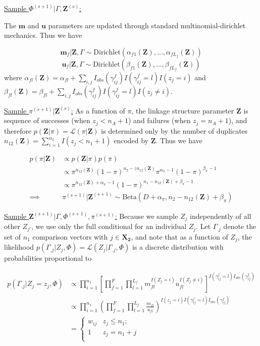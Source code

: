\documentclass[12pt,letterpaper]{article}
\newcommand{\1}[1]{\mathbb{I}\!\left[#1\right]} %
\begin{document}
\underline{Sample $\Phi^{(s+1)}|\Gamma, \bm{Z}^{(s)}$:}

The $\bm{m}$ and $\bm{u}$ parameters are updated through standard multinomial-dirichlet mechanics. Thus we have

$$\bm{m}_f|\bm{Z}, \Gamma \sim \text{Dirichlet}(\alpha_{f1}(\bm{Z}), \ldots, \alpha_{fL_f}(\bm{Z}))$$
$$\bm{u}_f|\bm{Z}, \Gamma \sim \text{Dirichlet}(\beta_{f1}(\bm{Z}), \ldots, \beta_{fL_f}(\bm{Z}))$$
where
\(\alpha_{fl}(\bm{Z})= \alpha_{fl} + \sum_{i,j} I_{obs}(\gamma_{ij}^f)I(\gamma_{ij}^f = l) I(z_j = i)\)
and
\(\beta_{fl}(\bm{Z})= \beta_{fl} + \sum_{i,j} I_{obs}(\gamma_{ij}^f)I(\gamma_{ij}^f = l) I(z_j \neq i)\).

\underline{Sample $\pi^{(s+1)}|\bm{Z}^{(s)}$:} As a function of
\(\pi\), the linkage structure parameter \(\bm{Z}\) is sequence
of successes (when \(z_j < n_A + 1\)) and failures (when
\(z_j = n_A + 1\)), and therefore
\(p(\bm{Z}|\pi) = \mathcal{L}(\pi|\bm{Z})\) is
determined only by the number of duplicates
$n_{12}(\bm{Z}) = \sum_{i=1}^{n_2}I(z_j < n_1 + 1)$ encoded by
$\bm{Z}$. Thus we have

\begin{align*}
p(\pi | \bm{Z}) &\propto p(\bm{Z}|\pi)p(\pi) \\
&\propto \pi^{n_{12}(\bm{Z})} (1-\pi)^{n_2 - (n_{12}(\bm{Z})} \pi^{\alpha_{\pi} -1} (1-\pi)^{\beta_{\pi} -1} \\
&\propto \pi^{n_{12}(\bm{Z}) + \alpha_{\pi} - 1} (1-\pi)^{n_1 - n_{12}(\bm{Z}) + \beta_{\pi} -1} \\
\implies &\pi^{(s+1)}|\bm{Z}^{(s+1)} \sim \text{Beta}(D + \alpha_{\pi}, n_2 - n_{12}(\bm{Z}) + \beta_{\pi})
\end{align*}

\underline{Sample $\bm{Z}^{(s+1)}|\Gamma, \Phi^{(s+1)}, \pi^{(s+1)}$:}
Because we sample \(Z_j\) independently of all other \(Z_{j'}\), we use
only the full conditional for an individual \(Z_j\). Let \(\Gamma_{.j}\)
denote the set of \(n_1\) comparison vectors with \(j \in \bm{X_2}\), and note that as a function of \(Z_j\), the likelihood
\(p(\Gamma_{.j}|Z_j, \Phi) = \mathcal{L}(Z_j|\Gamma_{.j}, \Phi)\)
is a discrete distribution with probabilities proportional to

\begin{align*}
	p(\Gamma_{.j}|Z_j = z_j, \Phi) &\propto \prod_{i=1}^{n_1}\left[\prod_{f=1}^{F}\prod_{l=1}^{L_f} m_{fl}^{I(Z_j = i)}u_{fl}^{I(Z_j \neq i)}\right]^{I(\gamma_{ij}^f = l)I_{obs}(\gamma_{ij}^f)}\\
	&\propto \prod_{i=1}^{n_1}\left(\prod_{f=1}^{F}\prod_{l=1}^{L_f} \frac{m_{fl}}{u_{fl}}\right)^{I(z_j = i) I(\gamma_{ij}^f = l)I_{obs}(\gamma_{ij}^f)} \\
	&=
	\begin{cases} 
		w_{ij}  & z_j \leq n_1; \\
		1 &  z_j  = n_1 + j \\
	\end{cases}\\
\end{align*}
\end{document}
